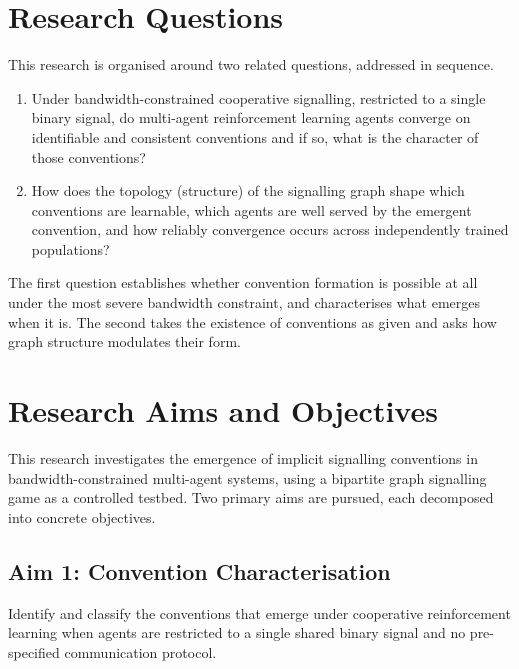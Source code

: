 \documentclass[a4paper,twoside,12pt]{report}
\begin{document}
    \section{Research Questions}
    
    This research is organised around two related questions, addressed in sequence.
    
    \begin{enumerate}
        \item Under bandwidth-constrained cooperative signalling, restricted to a
        single binary signal, do multi-agent reinforcement learning agents converge
        on identifiable and consistent conventions and if so, what is the
        character of those conventions?
    
        \item How does the topology (structure) of the signalling graph shape which conventions are learnable, which agents are well served by the emergent convention, and how reliably convergence occurs across independently trained populations?
    \end{enumerate}
    
    The first question establishes whether convention formation is possible at all
    under the most severe bandwidth constraint, and characterises what emerges when
    it is. The second takes the existence of conventions as given and asks how
    graph structure modulates their form.
    
    
    
    \section{Research Aims and Objectives}
    
    This research investigates the emergence of implicit signalling conventions in
    bandwidth-constrained multi-agent systems, using a bipartite graph signalling
    game as a controlled testbed. Two primary aims are pursued, each decomposed
    into concrete objectives.
    
    \subsection*{Aim 1: Convention Characterisation}
    
    Identify and classify the conventions that emerge under cooperative
    reinforcement learning when agents are restricted to a single shared binary
    signal and no pre-specified communication protocol.
    
\end{document}
